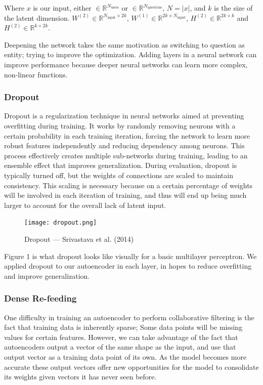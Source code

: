\documentclass{article}
\begin{document}
Where $x$ is our input, either $\in \mathbb{R}^{N_{\text{users}}}$ or $\in \mathbb{R}^{N_{\text{questions}}}$, $N = |x|$, and $k$ is the size of the latent dimension. $W^{(2)} \in \mathbb{R}^{N_{\text{input}}\times 2k}$, $W^{(1)} \in \mathbb{R}^{2k\times N_{\text{input}}}$, $H^{(2)} \in \mathbb{R}^{2k\times k}$ and $H^{(2)} \in \mathbb{R}^{k\times 2k}$.

Deepening the network takes the same motivation as switching to question as entity; trying to improve the optimization. Adding layers in a neural network can improve performance because deeper neural networks can learn more complex, non-linear functions.
\subsubsection{Dropout}

Dropout is a regularization technique in neural networks aimed at preventing overfitting during training. It works by randomly removing neurons with a certain probability in each training iteration, forcing the network to learn more robust features independently and reducing dependency among neurons. This process effectively creates multiple sub-networks during training, leading to an ensemble effect that improves generalization. During evaluation, dropout is typically turned off, but the weights of connections are scaled to maintain consistency. This scaling is necessary because on a certain percentage of weights will be involved in each iteration of training, and thus will end up being much larger to account for the overall lack of latent input.
\begin{figure}[H]
    \centering
    \texttt{[image: dropout.png]}
    \caption{Dropout — Srivastava et al. (2014)}
    \label{fig:enter-label}
\end{figure}

Figure 1 is what dropout looks like visually for a basic multilayer perceptron. We applied dropout to our autoencoder in each layer, in hopes to reduce overfitting and improve generalization.
\subsubsection{Dense Re-feeding}
One difficulty in training an autoencoder to perform collaborative filtering is the fact that training data is inherently sparse; Some data points will be missing values for certain features. However, we can take advantage of the fact that autoencoders output a vector of the same shape as the input, and use that output vector as a training data point of its own. As the model becomes more accurate these output vectors offer new opportunities for the model to consolidate its weights given vectors it has never seen before. 
\end{document}
